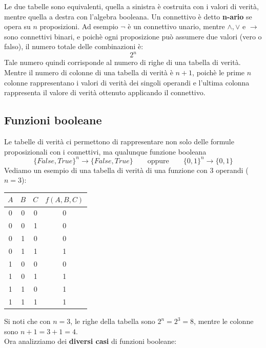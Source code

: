 Le due tabelle sono equivalenti, quella a sinistra è costruita con i valori di verità, mentre quella a destra con l'algebra booleana.
Un connettivo è detto \textbf{n-ario} se opera su $n$ proposizioni. Ad esempio $\neg$ è un connettivo unario, mentre $\wedge, \vee$ e $\to$ sono connettivi binari, e poichè ogni proposizione può assumere
due valori (vero o falso), il numero totale delle combinazioni è:
\[   2^n    \] 
Tale numero quindi corrisponde al numero di righe di una tabella di verità. Mentre il numero di colonne di una tabella di verità
è $n+1$, poichè le prime $n$ colonne rappresentano i valori di verità dei singoli operandi e l'ultima colonna rappresenta il valore di verità ottenuto 
applicando il connettivo.
\subsection{Funzioni booleane}
Le tabelle di verità ci permettono di rappresentare non solo delle formule proposizionali con i connettivi, ma qualunque funzione booleana
\[    \{False,True\}^n \to \{False, True \} \qquad \text{oppure} \qquad \{ 0,1 \}^n \to \{ 0,1 \}   \]
Vediamo un esempio di una tabella di verità di una funzione con 3 operandi ($n = 3$):
\begin{center}
    \begin{tabular}{|c|c|c||c|}
        \hline
        $A$ & $B$ & $C$ & $f(A, B, C)$ \\
        \hline \hline
        0 & 0 & 0 & 0 \\
        0 & 0 & 1 & 0 \\
        0 & 1 & 0 & 0 \\
        0 & 1 & 1 & 1 \\
        1 & 0 & 0 & 0 \\
        1 & 0 & 1 & 1 \\
        1 & 1 & 0 & 1 \\
        1 & 1 & 1 & 1 \\
        \hline
    \end{tabular}
\end{center}
Si noti che con $n = 3$, le righe della tabella sono $2^n = 2^3 = 8$, mentre le colonne sono $n+1 = 3+1 = 4.$\smallskip\\
Ora analizziamo dei \textbf{diversi casi} di funzioni booleane:
